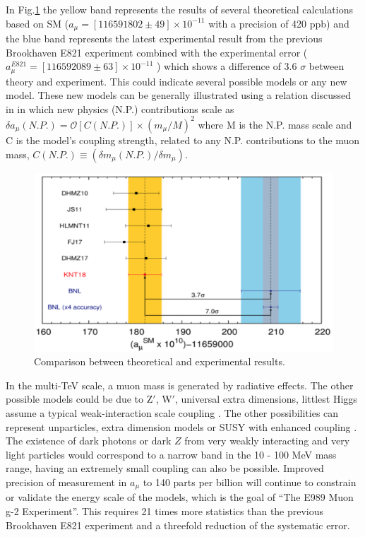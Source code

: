 \documentclass[journal,article,submit,moreauthors,pdftex,10pt,a4paper]{Definitions/mdpi}
\begin{document}
In Fig.\ref{fig2} the yellow band represents the results of several theoretical calculations based on SM
($a_\mu = [116591802\pm49]\times 10^{-11}$ \cite{davier} with a precision of 420 ppb) 
and the blue band represents the latest experimental result from  the previous
Brookhaven E821 experiment combined with the experimental error ($a_\mu^{E821} = [116592089\pm63]\times 10^{-11}$ \cite{benn})
which shows a difference of 3.6 $\sigma$ between theory and experiment. 
This could indicate several possible models or any new model. These new models can be generally illustrated
using a relation discussed in \cite{ Czarnecki} in which new physics (N.P.) contributions scale as \cite{Dave} 
$\delta a_{\mu}(N.P.) =\mathcal{O}[C(N.P.)] \times ( m_{\mu}/M)^2 $ where M is the N.P. mass
scale and C is the model's coupling strength, related to any N.P. contributions to the muon
mass, $C(N.P.) \equiv (\delta m_{\mu}(N.P.)/\delta m_{\mu} )$.
\begin{figure}[H]
\centering
\includegraphics[width=9 cm]{comp_theory_expt.png}
\caption{\label{fig2}Comparison between theoretical and experimental results.}
\end{figure} 

In the multi-TeV scale, a muon mass is generated by radiative effects. %
The other possible models could be due to Z$'$, W$'$, universal extra dimensions,
littlest Higgs assume a typical weak-interaction scale coupling \cite{Dave}. %
The other possibilities can represent 
unparticles, extra dimension models or SUSY with enhanced coupling \cite{Gorringe}. 
The existence of dark photons or dark $Z$ \cite{Davoudiasl:2012ig} from very weakly interacting and very 
light particles would correspond to a narrow band in the 10 - 100 MeV
mass range, having an extremely small coupling can also be possible. 
Improved precision of measurement in $a_{\mu}$ to 140 parts per billion will continue to
constrain or validate the energy scale of the models, which is the goal of ``The E989 
Muon g-2 Experiment''. This requires 21 times more statistics than the previous
Brookhaven E821 experiment and a threefold reduction of the systematic error.
\end{document}
